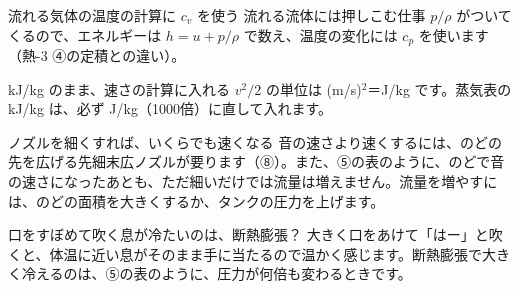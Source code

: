 \begin{tsumazuki}{流れる気体の温度の計算に $c_v$ を使う}
流れる流体には押しこむ仕事 $p/\rho$ がついてくるので、エネルギーは $h=u+p/\rho$ で数え、温度の変化には $c_p$ を使います（熱-3 ④の定積との違い）。
\end{tsumazuki}
\begin{tsumazuki}{kJ/kg のまま、速さの計算に入れる}
$v^2/2$ の単位は (m/s)$^2$＝J/kg です。蒸気表の kJ/kg は、必ず J/kg（1000倍）に直して入れます。
\end{tsumazuki}
\begin{tsumazuki}{ノズルを細くすれば、いくらでも速くなる}
音の速さより速くするには、のどの先を広げる先細末広ノズルが要ります（⑧）。また、⑤の表のように、のどで音の速さになったあとも、ただ細いだけでは流量は増えません。流量を増やすには、のどの面積を大きくするか、タンクの圧力を上げます。
\end{tsumazuki}
\begin{tsumazuki}{口をすぼめて吹く息が冷たいのは、断熱膨張？}
大きく口をあけて「はー」と吹くと、体温に近い息がそのまま手に当たるので温かく感じます。断熱膨張で大きく冷えるのは、⑤の表のように、圧力が何倍も変わるときです。
\end{tsumazuki}

